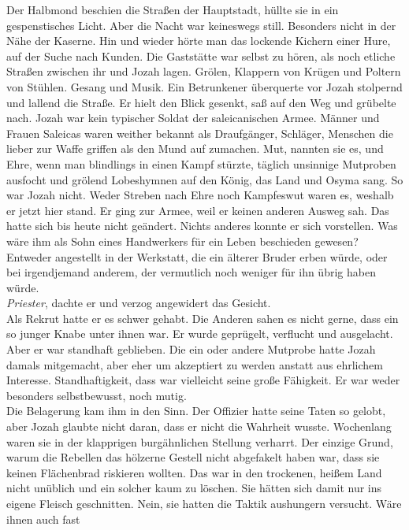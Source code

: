 Der Halbmond beschien die Straßen der Hauptstadt, hüllte sie in ein gespenstisches Licht. Aber die 
Nacht war keineswegs still. Besonders nicht in der Nähe der Kaserne. Hin und wieder hörte man das 
lockende Kichern einer Hure, auf der Suche nach Kunden. Die Gaststätte war selbst zu hören, als 
noch etliche Straßen zwischen ihr und Jozah lagen. Grölen, Klappern von Krügen und Poltern von 
Stühlen. Gesang und Musik. Ein Betrunkener überquerte vor Jozah stolpernd und lallend die Straße. 
Er hielt den Blick gesenkt, saß auf den Weg und grübelte nach. Jozah war kein typischer Soldat der 
saleicanischen Armee. Männer und Frauen Saleicas waren weither bekannt als Draufgänger, Schläger, 
Menschen die lieber zur Waffe griffen als den Mund auf zumachen. Mut, nannten sie es, und Ehre, 
wenn man blindlings in einen Kampf stürzte, täglich unsinnige Mutproben ausfocht und grölend 
Lobeshymnen auf den König, das Land und Osyma sang. So war Jozah nicht. Weder Streben nach Ehre 
noch Kampfeswut waren es, weshalb er jetzt hier stand. Er ging zur Armee, weil er keinen anderen 
Ausweg sah. Das hatte sich bis heute nicht geändert. Nichts anderes konnte er sich vorstellen. Was 
wäre ihm als Sohn eines Handwerkers für ein Leben beschieden gewesen? Entweder angestellt in der 
Werkstatt, die ein älterer Bruder erben würde, oder bei irgendjemand anderem, der vermutlich noch 
weniger für ihn übrig haben würde. \\
\textit{Priester}, dachte er und verzog angewidert das Gesicht. \\
Als Rekrut hatte er es schwer gehabt. Die Anderen sahen es nicht gerne, dass ein so junger Knabe 
unter ihnen war. Er wurde geprügelt, verflucht und ausgelacht. Aber er war standhaft geblieben. Die 
ein oder andere Mutprobe hatte Jozah damals mitgemacht, aber eher um akzeptiert zu werden anstatt 
aus ehrlichem Interesse. Standhaftigkeit, dass war vielleicht seine große Fähigkeit. Er war weder 
besonders selbstbewusst, noch mutig. \\
Die Belagerung kam ihm in den Sinn. Der Offizier hatte seine Taten so gelobt, aber Jozah glaubte 
nicht daran, dass er nicht die Wahrheit wusste. Wochenlang waren sie in der klapprigen 
burgähnlichen Stellung verharrt. Der einzige Grund, warum die Rebellen das hölzerne Gestell nicht 
abgefakelt haben war, dass sie keinen Flächenbrad riskieren wollten. Das war in den trockenen, 
heißem Land nicht unüblich und ein solcher kaum zu löschen. Sie hätten sich damit nur ins eigene 
Fleisch geschnitten. Nein, sie hatten die Taktik aushungern versucht. Wäre ihnen auch fast 
